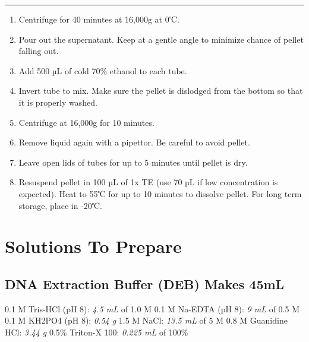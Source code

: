 \documentclass[
]{book}
\providecommand{\tightlist}{%
  \setlength{\itemsep}{0pt}\setlength{\parskip}{0pt}}
\begin{document}
\begin{center}\rule{0.5\linewidth}{0.5pt}\end{center}

\begin{enumerate}
\def\labelenumi{\arabic{enumi}.}
\setcounter{enumi}{4}
\tightlist
\item
  Centrifuge for 40 minutes at 16,000g at 0℃.
\item
  Pour out the supernatant. Keep at a gentle angle to minimize chance of pellet falling out.
\item
  Add 500 µL of cold 70\% ethanol to each tube.
\item
  Invert tube to mix. Make sure the pellet is dislodged from the bottom so that it is properly washed.
\item
  Centrifuge at 16,000g for 10 minutes.
\item
  Remove liquid again with a pipettor. Be careful to avoid pellet.
\item
  Leave open lids of tubes for up to 5 minutes until pellet is dry.
\item
  Resuspend pellet in 100 µL of 1x TE (use 70 µL if low concentration is expected). Heat to 55℃ for up to 10 minutes to dissolve pellet.
  For long term storage, place in -20℃.
\end{enumerate}

\hypertarget{solutions-to-prepare}{%
\section{Solutions To Prepare}\label{solutions-to-prepare}}

\hypertarget{dna-extraction-buffer-deb-makes-45ml}{%
\subsection{DNA Extraction Buffer (DEB) Makes 45mL}\label{dna-extraction-buffer-deb-makes-45ml}}

0.1 M Tris-HCl (pH 8): \emph{4.5 mL} of 1.0 M
0.1 M Na-EDTA (pH 8): \emph{9 mL} of 0.5 M
0.1 M KH2PO4 (pH 8): \emph{0.54 g}
1.5 M NaCl: \emph{13.5 mL} of 5 M
0.8 M Guanidine HCl: \emph{3.44 g}
0.5\% Triton-X 100: \emph{0.225 mL} of 100\%
\end{document}
